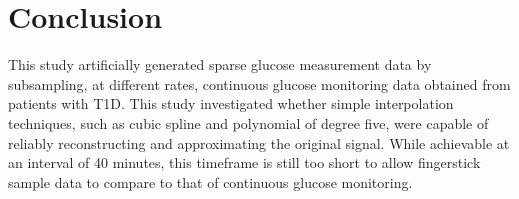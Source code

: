 
\section{Conclusion}

 
 This study artificially generated sparse glucose measurement data by subsampling, at different rates, continuous glucose monitoring data obtained from patients with T1D. This study investigated whether simple interpolation techniques, such as cubic spline and polynomial of degree five, were capable of reliably reconstructing and approximating the original signal. While achievable at an interval of 40 minutes, this timeframe is still too short to allow fingerstick sample data to compare to that of continuous glucose monitoring.
 